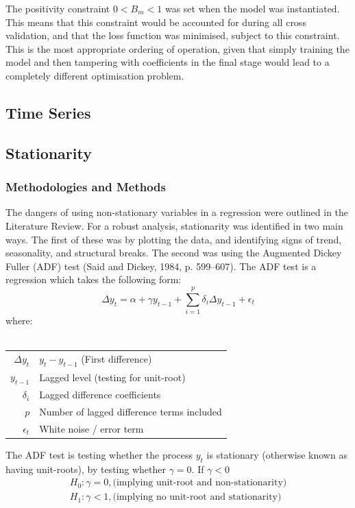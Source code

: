 \documentclass[11pt, a4paper]{article}
\begin{document}
The positivity constraint $0<B_{m}<1$ was set when the model was instantiated. This means that this constraint would be accounted for during all cross validation, and that the loss function was minimised, subject to this constraint. This is the most appropriate ordering of operation, given that simply training the model and then tampering with coefficients in the final stage would lead to a completely different optimisation problem.
\subsection{Time Series}

\subsection{Stationarity}

\subsubsection{Methodologies and Methods}

The dangers of using non-stationary variables in a regression were outlined in the Literature Review. For a robust analysis, stationarity was identified in two main ways. The first of these was by plotting the data, and identifying signs of trend, seasonality, and structural breaks. The second was using the Augmented Dickey Fuller (ADF) test (Said and Dickey, 1984, p. 599–607). The ADF test is a regression which takes the following form:  
\begin{equation}
\Delta y_{t} = \alpha + \gamma y_{t-1} + \sum_{i=1}^{p}\delta_{i} \Delta y_{t-1} + \epsilon_{t}
\end{equation}
where:\\\\
\hspace{1cm}
\begin{tabular}{r@{ : }l}
$\Delta y_{t}$ & $ y_{t} - y_{t-1}$ (First difference)\\
$y_{t-1}$ & Lagged level (testing for unit-root)\\
$\delta_{i}$ & Lagged difference coefficients\\
$p$ & Number of lagged difference terms included\\
$\epsilon_{t}$ & White noise / error term
\end{tabular}

The ADF test is testing whether the process $y_{t}$ is stationary (otherwise known as having unit-roots), by testing whether $\gamma=0$. If $\gamma<0$
\begin{gather*}
H_{0}: \gamma = 0, \text{(implying unit-root and non-stationarity)}\\
H_{1}: \gamma < 1, \text{(implying no unit-root and stationarity)}
\end{gather*}
\end{document}
